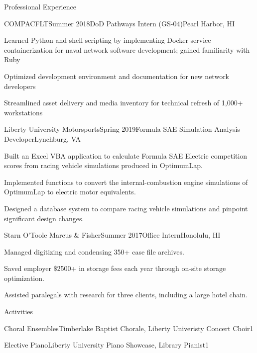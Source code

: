 \documentclass{resume-classica}
\begin{document}
\begin{rSection}{Professional Experience}
    \begin{rSubsectionList}{COMPACFLT}{Summer 2018}{DoD Pathways Intern (GS-04)}{Pearl Harbor, HI}
        \item Learned Python and shell scripting by implementing Docker service containerization for naval network software development; gained familiarity with Ruby
        \item Optimized development environment and documentation for new network developers
        \item Streamlined asset delivery and media inventory for technical refresh of 1,000+ workstations
    \end{rSubsectionList}

    \begin{rSubsectionList}{Liberty University Motorsports}{Spring 2019}{Formula SAE Simulation-Analysis Developer}{Lynchburg, VA}
        \item Built an Excel VBA application to calculate Formula SAE Electric competition scores from racing vehicle simulations produced in OptimumLap.
        \item Implemented functions to convert the internal-combustion engine simulations of OptimumLap to electric motor equivalents.
        \item Designed a database system to compare racing vehicle simulations and pinpoint significant design changes.
    \end{rSubsectionList}
    
    \begin{rSubsectionList}{Starn O'Toole Marcus \& Fisher}{Summer 2017}{Office Intern}{Honolulu, HI}
        \item Managed digitizing and condensing 350+ case file archives.
        \item Saved employer \$2500+ in storage fees each year through on-site storage optimization.
        \item Assisted paralegals with research for three clients, including a large hotel chain.
    \end{rSubsectionList}
\end{rSection}

\begin{rSection}{Activities}
    \begin{rLabeledList}{\bfseries}
        \item{Choral Ensembles}{Timberlake Baptist Chorale, Liberty Univeristy Concert Choir}{1}
        \item{Elective Piano}{Liberty University Piano Showcase, Library Pianist}{1}
    \end{rLabeledList}
\end{rSection}
\end{document}
